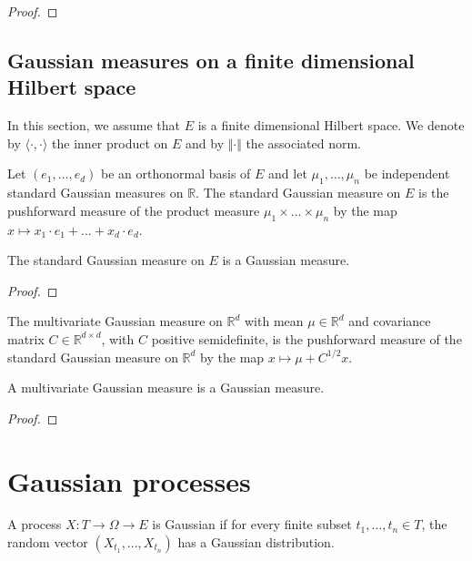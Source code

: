 \begin{proof}

\end{proof}


\subsection{Gaussian measures on a finite dimensional Hilbert space}

In this section, we assume that $E$ is a finite dimensional Hilbert space. We denote by $\langle \cdot, \cdot \rangle$ the inner product on $E$ and by $\Vert \cdot \Vert$ the associated norm.

\begin{definition}\label{def:stdGaussian}
Let $(e_1, \ldots, e_d)$ be an orthonormal basis of $E$ and let $\mu_1, \ldots, \mu_n$ be independent standard Gaussian measures on $\mathbb{R}$.
The standard Gaussian measure on $E$ is the pushforward measure of the product measure $\mu_1 \times \ldots \times \mu_n$ by the map $x \mapsto x_1 \cdot e_1 + \ldots + x_d \cdot e_d$.
\end{definition}


\begin{lemma}\label{lem:isGaussian_stdGaussian}
The standard Gaussian measure on $E$ is a Gaussian measure.
\end{lemma}

\begin{proof}

\end{proof}


\begin{definition}\label{def:multivariateGaussian}
The multivariate Gaussian measure on $\mathbb{R}^d$ with mean $\mu \in \mathbb{R}^d$ and covariance matrix $C \in \mathbb{R}^{d \times d}$, with $C$ positive semidefinite, is the pushforward measure of the standard Gaussian measure on $\mathbb{R}^d$ by the map $x \mapsto \mu + C^{1/2} x$.
\end{definition}


\begin{lemma}\label{lem:isGaussian_multivariateGaussian}
A multivariate Gaussian measure is a Gaussian measure.
\end{lemma}

\begin{proof}

\end{proof}


\section{Gaussian processes}
\label{sec:gaussian_processes}

\begin{definition}\label{def:IsGaussianProcess}
A process $X : T \to \Omega \to E$ is Gaussian if for every finite subset $t_1, \ldots, t_n \in T$, the random vector $(X_{t_1}, \ldots, X_{t_n})$ has a Gaussian distribution.
\end{definition}
